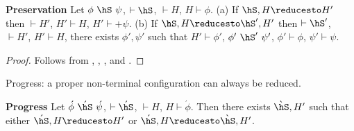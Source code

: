 


\begin{Theorem}{\textbf{Preservation}}
\label{Theorem:Preservation}
Let $\phi~\hS~\psi$, $\vdash \hS$, $\vdash H$, $H \vdash \phi$.
(a) If $\hS,H \reducesto H'$ then $\vdash H'$, $H' \vdash H$, $H' \vdash +\psi$.
(b) If $\hS,H \reducesto \hS',H'$ then $\vdash \hS'$, $\vdash H'$, $H' \vdash H$,
there exists $\phi',\psi'$ such
that $H' \vdash \phi'$, $\phi'~\hS'~\psi'$, $\phi' \vdash \phi$, $\psi' \vdash \psi$.
\end{Theorem}
\begin{proof}
Follows from ,  , ,
    and .
\end{proof}

Progress: a proper non-terminal configuration can always be reduced.
\begin{Theorem}{\textbf{Progress}}
Let $\acute{\phi}~\acute{\hS}~\acute{\psi}$, $\vdash \acute{\hS}$, $\vdash H$, $H \vdash \acute{\phi}$.
Then there exists $\grave{\hS},H'$ such
    that either $\acute{\hS},H \reducesto H'$ or $\acute{\hS},H \reducesto \grave{\hS},H'$.
\end{Theorem}
